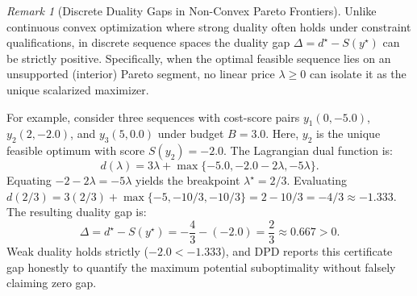 \documentclass[11pt,a4paper]{article}
\theoremstyle{plain}
\theoremstyle{definition}
\theoremstyle{remark}
\newtheorem{remark}{Remark}
\begin{document}
\begin{remark}[Discrete Duality Gaps in Non-Convex Pareto Frontiers]
Unlike continuous convex optimization where strong duality often holds under constraint qualifications, in discrete sequence spaces the duality gap $\Delta = d^\star - S(y^\star)$ can be strictly positive. Specifically, when the optimal feasible sequence lies on an unsupported (interior) Pareto segment, no linear price $\lambda \ge 0$ can isolate it as the unique scalarized maximizer. 

For example, consider three sequences with cost-score pairs $y_1(0, -5.0)$, $y_2(2, -2.0)$, and $y_3(5, 0.0)$ under budget $B=3.0$. Here, $y_2$ is the unique feasible optimum with score $S(y_2) = -2.0$. The Lagrangian dual function is:
\begin{equation}
d(\lambda) = 3\lambda + \max\{-5.0, -2.0 - 2\lambda, -5\lambda\}.
\end{equation}
Equating $-2 - 2\lambda = -5\lambda$ yields the breakpoint $\lambda^\star = 2/3$. Evaluating $d(2/3) = 3(2/3) + \max\{-5, -10/3, -10/3\} = 2 - 10/3 = -4/3 \approx -1.333$. The resulting duality gap is:
\begin{equation}
\Delta = d^\star - S(y^\star) = -\frac{4}{3} - (-2.0) = \frac{2}{3} \approx 0.667 > 0.
\end{equation}
Weak duality holds strictly ($-2.0 < -1.333$), and DPD reports this certificate gap honestly to quantify the maximum potential suboptimality without falsely claiming zero gap.
\end{remark}
\end{document}
